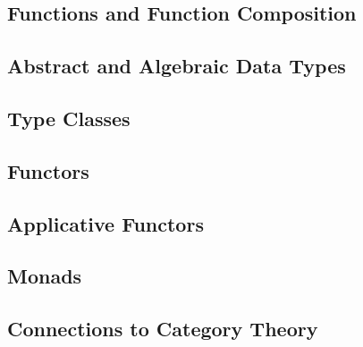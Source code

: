\documentclass[thesis.tex]{subfiles}
\begin{document}
\subsection{Functions and Function Composition}

\subsection{Abstract and Algebraic Data Types}

\subsection{Type Classes}

\subsection{Functors}

\subsection{Applicative Functors}

\subsection{Monads}

\subsection{Connections to Category Theory}
\end{document}
